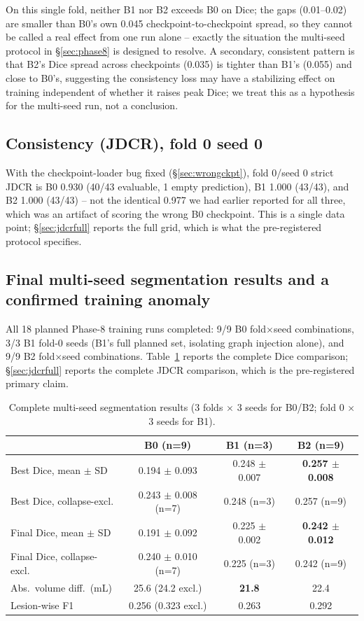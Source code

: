 \documentclass[conference]{IEEEtran}
\begin{document}
On this single fold, neither B1 nor B2 exceeds B0 on Dice; the gaps (0.01--0.02) are smaller than B0's own 0.045 checkpoint-to-checkpoint spread, so they cannot be called a real effect from one run alone -- exactly the situation the multi-seed protocol in \S\ref{sec:phase8} is designed to resolve. A secondary, consistent pattern is that B2's Dice spread across checkpoints (0.035) is tighter than B1's (0.055) and close to B0's, suggesting the consistency loss may have a stabilizing effect on training independent of whether it raises peak Dice; we treat this as a hypothesis for the multi-seed run, not a conclusion.

\subsection{Consistency (JDCR), fold 0 seed 0}
With the checkpoint-loader bug fixed (\S\ref{sec:wrongckpt}), fold 0/seed 0 strict JDCR is B0 0.930 (40/43 evaluable, 1 empty prediction), B1 1.000 (43/43), and B2 1.000 (43/43) -- not the identical 0.977 we had earlier reported for all three, which was an artifact of scoring the wrong B0 checkpoint. This is a single data point; \S\ref{sec:jdcrfull} reports the full grid, which is what the pre-registered protocol specifies.

\subsection{Final multi-seed segmentation results and a confirmed training anomaly}
\label{sec:interim}

All 18 planned Phase-8 training runs completed: 9/9 B0 fold$\times$seed combinations, 3/3 B1 fold-0 seeds (B1's full planned set, isolating graph injection alone), and 9/9 B2 fold$\times$seed combinations. Table~\ref{tab:multiseed} reports the complete Dice comparison; \S\ref{sec:jdcrfull} reports the complete JDCR comparison, which is the pre-registered primary claim.

\begin{table}[t]
\centering
\caption{Complete multi-seed segmentation results (3 folds $\times$ 3 seeds for B0/B2; fold 0 $\times$ 3 seeds for B1).}
\label{tab:multiseed}
\begin{tabular}{lccc}
\toprule
& \textbf{B0 (n=9)} & \textbf{B1 (n=3)} & \textbf{B2 (n=9)} \\
\midrule
Best Dice, mean $\pm$ SD & 0.194 $\pm$ 0.093 & 0.248 $\pm$ 0.007 & \textbf{0.257 $\pm$ 0.008} \\
Best Dice, collapse-excl. & 0.243 $\pm$ 0.008 (n=7) & 0.248 (n=3) & 0.257 (n=9) \\
Final Dice, mean $\pm$ SD & 0.191 $\pm$ 0.092 & 0.225 $\pm$ 0.002 & \textbf{0.242 $\pm$ 0.012} \\
Final Dice, collapse-excl. & 0.240 $\pm$ 0.010 (n=7) & 0.225 (n=3) & 0.242 (n=9) \\
Abs.\ volume diff.\ (mL) & 25.6 (24.2 excl.) & \textbf{21.8} & 22.4 \\
Lesion-wise F1 & 0.256 (0.323 excl.) & 0.263 & 0.292 \\
\bottomrule
\end{tabular}
\end{table}
\end{document}
